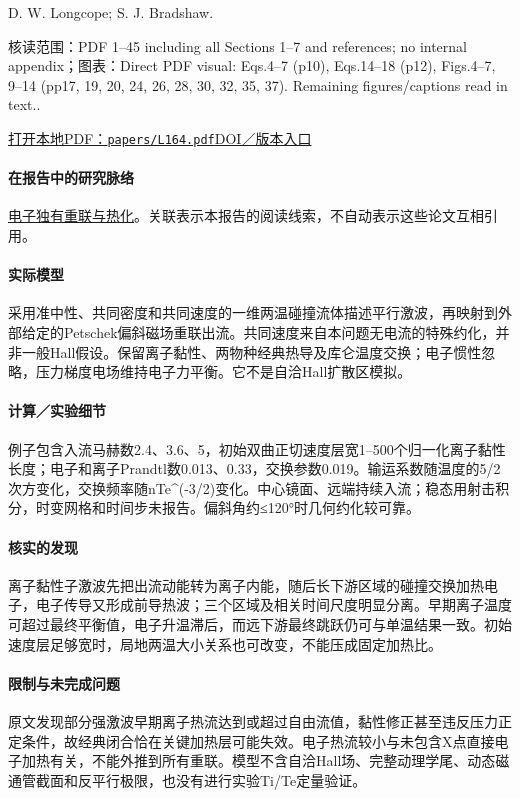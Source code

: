 D. W. Longcope;  S. J. Bradshaw.

\textsf{核读范围：}PDF 1–45 including all Sections 1–7 and references;  no internal appendix；\textsf{图表：}Direct PDF visual: Eqs.4–7 (p10),  Eqs.14–18 (p12),  Figs.4–7, 9–14 (pp17, 19, 20, 24, 26, 28, 30, 32, 35, 37). Remaining figures/captions read in text..

\href{run:papers/L164.pdf}{打开本地PDF：\texttt{papers/L164.pdf}}\quad\href{https://doi.org/10.1088/0004-637X/718/2/1491}{DOI／版本入口}

\paragraph{在报告中的研究脉络}\hyperref[story:energy]{电子独有重联与热化}。关联表示本报告的阅读线索，不自动表示这些论文互相引用。

\paragraph{实际模型}采用准中性、共同密度和共同速度的一维两温碰撞流体描述平行激波，再映射到外部给定的Petschek偏斜磁场重联出流。共同速度来自本问题无电流的特殊约化，并非一般Hall假设。保留离子黏性、两物种经典热导及库仑温度交换；电子惯性忽略，压力梯度电场维持电子力平衡。它不是自洽Hall扩散区模拟。

\paragraph{计算／实验细节}例子包含入流马赫数2.4、3.6、5，初始双曲正切速度层宽1–500个归一化离子黏性长度；电子和离子Prandtl数0.013、0.33，交换参数0.019。输运系数随温度的5/2次方变化，交换频率随nTe\textasciicircum{}(-3/2)变化。中心镜面、远端持续入流；稳态用射击积分，时变网格和时间步未报告。偏斜角约≤120°时几何约化较可靠。

\paragraph{核实的发现}离子黏性子激波先把出流动能转为离子内能，随后长下游区域的碰撞交换加热电子，电子传导又形成前导热波；三个区域及相关时间尺度明显分离。早期离子温度可超过最终平衡值，电子升温滞后，而远下游最终跳跃仍可与单温结果一致。初始速度层足够宽时，局地两温大小关系也可改变，不能压成固定加热比。

\paragraph{限制与未完成问题}原文发现部分强激波早期离子热流达到或超过自由流值，黏性修正甚至违反压力正定条件，故经典闭合恰在关键加热层可能失效。电子热流较小与未包含X点直接电子加热有关，不能外推到所有重联。模型不含自洽Hall场、完整动理学尾、动态磁通管截面和反平行极限，也没有进行实验Ti/Te定量验证。

